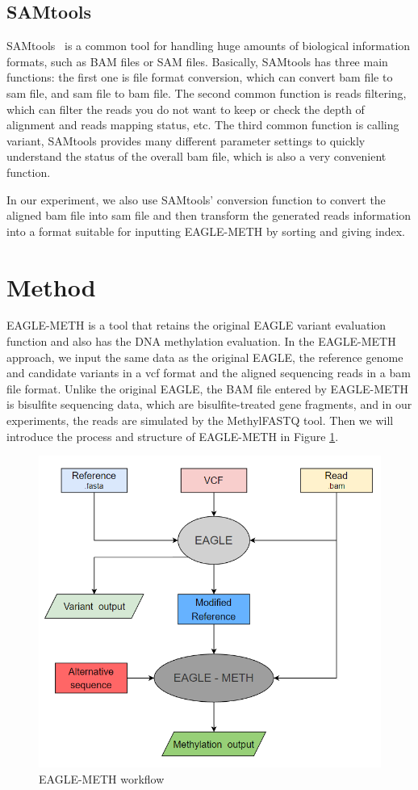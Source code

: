\documentclass{PHlab-thesis}
\begin{document}
\subsection{SAMtools}
SAMtools~\cite{li2009sequence} is a common tool for handling huge amounts of biological information formats, such as BAM files or SAM files.
Basically, SAMtools has three main functions: the first one is file format conversion, which can convert bam file to sam file, and sam file to bam file. The second common function is reads filtering, which can filter the reads you do not want to keep or check the depth of alignment and reads mapping status, etc. The third common function is calling variant, SAMtools provides many different parameter settings to quickly understand the status of the overall bam file, which is also a very convenient function.
\par In our experiment, we also use SAMtools' conversion function to convert the aligned bam file into sam file and then transform the generated reads information into a format suitable for inputting EAGLE-METH by sorting and giving index.

\section{Method}
EAGLE-METH is a tool that retains the original EAGLE variant evaluation function and also has the DNA methylation evaluation.
In the EAGLE-METH approach, we input the same data as the original EAGLE, the reference genome and candidate variants in a vcf format and the aligned sequencing reads in a bam file format. Unlike the original EAGLE, the BAM file entered by EAGLE-METH is bisulfite sequencing data, which are bisulfite-treated gene fragments, and in our experiments, the reads are simulated by the MethylFASTQ tool. Then we will introduce the process and structure of EAGLE-METH in Figure \ref{fig:EAGLE-METH}.

\begin{figure}[h]
  \centering
  \includegraphics[scale=0.8]{figures/eagle_workflow_v2.PNG}
  \caption{EAGLE-METH workflow}
  \label{fig:EAGLE-METH}
\end{figure}
\end{document}
